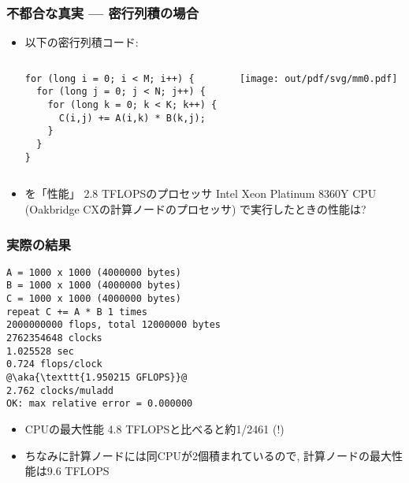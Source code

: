 \documentclass[10pt,dvipdfmx]{beamer}
\newcommand{\aka}[1]{{\color{red}#1}}
\begin{document}
\begin{frame}[fragile]
  \frametitle{不都合な真実 --- 密行列積の場合}
  \begin{itemize}
  \item 以下の密行列積コード:
\begin{columns}
\begin{column}{0.5\textwidth}
\begin{lstlisting}
for (long i = 0; i < M; i++) {
  for (long j = 0; j < N; j++) {
    for (long k = 0; k < K; k++) {
      C(i,j) += A(i,k) * B(k,j);
    }
  }
}
\end{lstlisting}
\end{column}
\begin{column}{0.5\textwidth}
\texttt{[image: out/pdf/svg/mm0.pdf]}
\end{column}
\end{columns}

\item を「性能」 2.8 TFLOPSのプロセッサ
  Intel Xeon Platinum 8360Y CPU (Oakbridge CXの計算ノードのプロセッサ)
  で実行したときの性能は?
\end{itemize}
\end{frame}

\begin{frame}[fragile]
\frametitle{実際の結果}
\begin{lstlisting}
A = 1000 x 1000 (4000000 bytes)
B = 1000 x 1000 (4000000 bytes)
C = 1000 x 1000 (4000000 bytes)
repeat C += A * B 1 times
2000000000 flops, total 12000000 bytes
2762354648 clocks
1.025528 sec
0.724 flops/clock
@\aka{\texttt{1.950215 GFLOPS}}@
2.762 clocks/muladd
OK: max relative error = 0.000000
\end{lstlisting}

\begin{itemize}
\item CPUの最大性能 4.8 TFLOPSと比べると約\aka{1/2461} (!)
  
\item ちなみに計算ノードには同CPUが2個積まれているので,
  計算ノードの最大性能は9.6 TFLOPS
\end{itemize}
\end{frame}
\end{document}
